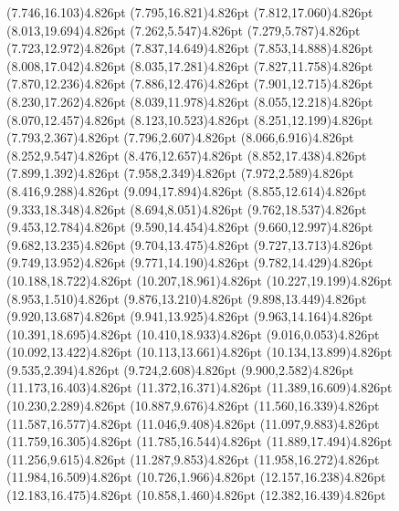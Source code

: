 \documentclass[10pt]{article}
\begin{document}
{{\qdisk(7.746,16.103){4.826pt}%
\qdisk(7.795,16.821){4.826pt}%
\qdisk(7.812,17.060){4.826pt}%
\qdisk(8.013,19.694){4.826pt}%
\qdisk(7.262,5.547){4.826pt}%
\qdisk(7.279,5.787){4.826pt}%
\qdisk(7.723,12.972){4.826pt}%
\qdisk(7.837,14.649){4.826pt}%
\qdisk(7.853,14.888){4.826pt}%
\qdisk(8.008,17.042){4.826pt}%
\qdisk(8.035,17.281){4.826pt}%
\qdisk(7.827,11.758){4.826pt}%
\qdisk(7.870,12.236){4.826pt}%
\qdisk(7.886,12.476){4.826pt}%
\qdisk(7.901,12.715){4.826pt}%
\qdisk(8.230,17.262){4.826pt}%
\qdisk(8.039,11.978){4.826pt}%
\qdisk(8.055,12.218){4.826pt}%
\qdisk(8.070,12.457){4.826pt}%
\qdisk(8.123,10.523){4.826pt}%
\qdisk(8.251,12.199){4.826pt}%
\qdisk(7.793,2.367){4.826pt}%
\qdisk(7.796,2.607){4.826pt}%
\qdisk(8.066,6.916){4.826pt}%
\qdisk(8.252,9.547){4.826pt}%
\qdisk(8.476,12.657){4.826pt}%
\qdisk(8.852,17.438){4.826pt}%
\qdisk(7.899,1.392){4.826pt}%
\qdisk(7.958,2.349){4.826pt}%
\qdisk(7.972,2.589){4.826pt}%
\qdisk(8.416,9.288){4.826pt}%
\qdisk(9.094,17.894){4.826pt}%
\qdisk(8.855,12.614){4.826pt}%
\qdisk(9.333,18.348){4.826pt}%
\qdisk(8.694,8.051){4.826pt}%
\qdisk(9.762,18.537){4.826pt}%
\qdisk(9.453,12.784){4.826pt}%
\qdisk(9.590,14.454){4.826pt}%
\qdisk(9.660,12.997){4.826pt}%
\qdisk(9.682,13.235){4.826pt}%
\qdisk(9.704,13.475){4.826pt}%
\qdisk(9.727,13.713){4.826pt}%
\qdisk(9.749,13.952){4.826pt}%
\qdisk(9.771,14.190){4.826pt}%
\qdisk(9.782,14.429){4.826pt}%
\qdisk(10.188,18.722){4.826pt}%
\qdisk(10.207,18.961){4.826pt}%
\qdisk(10.227,19.199){4.826pt}%
\qdisk(8.953,1.510){4.826pt}%
\qdisk(9.876,13.210){4.826pt}%
\qdisk(9.898,13.449){4.826pt}%
\qdisk(9.920,13.687){4.826pt}%
\qdisk(9.941,13.925){4.826pt}%
\qdisk(9.963,14.164){4.826pt}%
\qdisk(10.391,18.695){4.826pt}%
\qdisk(10.410,18.933){4.826pt}%
\qdisk(9.016,0.053){4.826pt}%
\qdisk(10.092,13.422){4.826pt}%
\qdisk(10.113,13.661){4.826pt}%
\qdisk(10.134,13.899){4.826pt}%
\qdisk(9.535,2.394){4.826pt}%
\qdisk(9.724,2.608){4.826pt}%
\qdisk(9.900,2.582){4.826pt}%
\qdisk(11.173,16.403){4.826pt}%
\qdisk(11.372,16.371){4.826pt}%
\qdisk(11.389,16.609){4.826pt}%
\qdisk(10.230,2.289){4.826pt}%
\qdisk(10.887,9.676){4.826pt}%
\qdisk(11.560,16.339){4.826pt}%
\qdisk(11.587,16.577){4.826pt}%
\qdisk(11.046,9.408){4.826pt}%
\qdisk(11.097,9.883){4.826pt}%
\qdisk(11.759,16.305){4.826pt}%
\qdisk(11.785,16.544){4.826pt}%
\qdisk(11.889,17.494){4.826pt}%
\qdisk(11.256,9.615){4.826pt}%
\qdisk(11.287,9.853){4.826pt}%
\qdisk(11.958,16.272){4.826pt}%
\qdisk(11.984,16.509){4.826pt}%
\qdisk(10.726,1.966){4.826pt}%
\qdisk(12.157,16.238){4.826pt}%
\qdisk(12.183,16.475){4.826pt}%
\qdisk(10.858,1.460){4.826pt}%
\qdisk(12.382,16.439){4.826pt}%
}}
\end{document}
